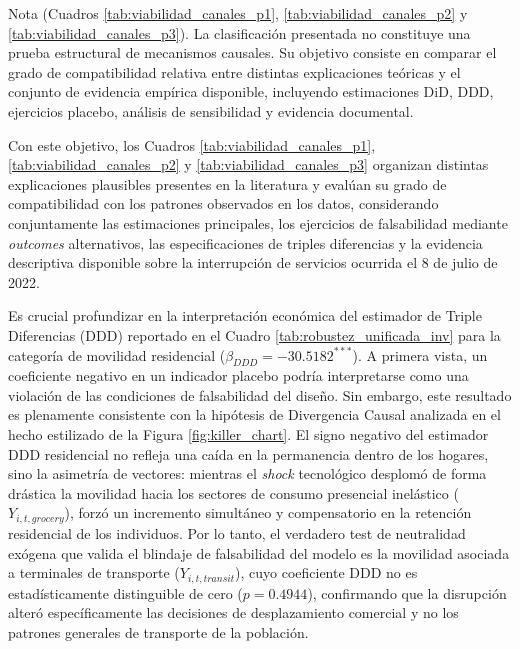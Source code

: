 \begin{table}[H]
    \vspace{0.15cm}
    \begin{flushleft}
    \small{Nota (Cuadros \ref{tab:viabilidad_canales_p1}, \ref{tab:viabilidad_canales_p2} y \ref{tab:viabilidad_canales_p3}). La clasificaci\'on presentada no constituye una prueba estructural de mecanismos causales. Su objetivo consiste en comparar el grado de compatibilidad relativa entre distintas explicaciones te\'oricas y el conjunto de evidencia emp\'irica disponible, incluyendo estimaciones DiD, DDD, ejercicios placebo, an\'alisis de sensibilidad y evidencia documental.}
    \end{flushleft}
\end{table}

Con este objetivo, los Cuadros \ref{tab:viabilidad_canales_p1}, \ref{tab:viabilidad_canales_p2} y \ref{tab:viabilidad_canales_p3} organizan distintas explicaciones plausibles presentes en la literatura y eval\'uan su grado de compatibilidad con los patrones observados en los datos, considerando conjuntamente las estimaciones principales, los ejercicios de falsabilidad mediante \textit{outcomes} alternativos, las especificaciones de triples diferencias y la evidencia descriptiva disponible sobre la interrupci\'on de servicios ocurrida el 8 de julio de 2022.

Es crucial profundizar en la interpretaci\'on econ\'omica del estimador de Triple Diferencias (DDD) reportado en el Cuadro \ref{tab:robustez_unificada_inv} para la categor\'ia de movilidad residencial ($\beta_{DDD} = -30.5182^{***}$). A primera vista, un coeficiente negativo en un indicador placebo podr\'ia interpretarse como una violaci\'on de las condiciones de falsabilidad del dise\~no. Sin embargo, este resultado es plenamente consistente con la hip\'otesis de Divergencia Causal analizada en el hecho estilizado de la Figura \ref{fig:killer_chart}. El signo negativo del estimador DDD residencial no refleja una ca\'ida en la permanencia dentro de los hogares, sino la asimetr\'ia de vectores: mientras el \textit{shock} tecnol\'ogico desplom\'o de forma dr\'astica la movilidad hacia los sectores de consumo presencial inel\'astico ($Y_{i,t,grocery}$), forz\'o un incremento simult\'aneo y compensatorio en la retenci\'on residencial de los individuos. Por lo tanto, el verdadero test de neutralidad ex\'ogena que valida el blindaje de falsabilidad del modelo es la movilidad asociada a terminales de transporte ($Y_{i,t,transit}$), cuyo coeficiente DDD no es estad\'isticamente distinguible de cero ($p = 0.4944$), confirmando que la disrupci\'on alter\'o espec\'ificamente las decisiones de desplazamiento comercial y no los patrones generales de transporte de la poblaci\'on.

